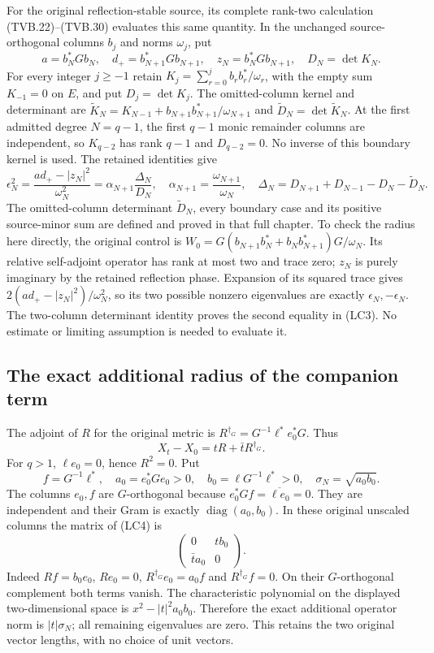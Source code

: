\documentclass{article}
\begin{document}
For the original reflection-stable source, its complete rank-two
calculation (TVB.22)--(TVB.30) evaluates this same quantity. In the
unchanged source-orthogonal columns \(b_j\) and norms \(\omega_j\),
put
\[
 a=b_N^*Gb_N,\quad d_+=b_{N+1}^*Gb_{N+1},\quad
 z_N=b_N^*Gb_{N+1},\quad D_N=\det K_N.
\]
For every integer $j\ge-1$ retain
$K_j=\sum_{r=0}^{j}b_rb_r^*/\omega_r$, with the empty sum
$K_{-1}=0$ on $E$, and put $D_j=\det K_j$.
The omitted-column kernel and determinant are
$\widetilde K_N=K_{N-1}+b_{N+1}b_{N+1}^*/\omega_{N+1}$ and
$\widetilde D_N=\det\widetilde K_N$.
At the first admitted degree $N=q-1$, the first $q-1$ monic
remainder columns are independent, so $K_{q-2}$ has rank $q-1$
and $D_{q-2}=0$. No inverse of this boundary kernel is used.
The retained identities give
\[
 \epsilon_N^2=\frac{ad_+-|z_N|^2}{\omega_N^2}
       =\alpha_{N+1}\frac{\Delta_N}{D_N},
 \quad\alpha_{N+1}=\frac{\omega_{N+1}}{\omega_N},
 \quad
 \Delta_N=D_{N+1}+D_{N-1}-D_N-\widetilde D_N.
 \tag{LC3}
\]
The omitted-column determinant \(\widetilde D_N\), every boundary
case and its positive source-minor sum are defined and proved in
that full chapter. To check the radius here directly, the original
control is
\(W_0=G(b_{N+1}b_N^*+b_Nb_{N+1}^*)G/\omega_N\).
Its relative self-adjoint operator has rank at most two and trace
zero; \(z_N\) is purely imaginary by the retained reflection phase.
Expansion of its squared trace gives
\(2(ad_+-|z_N|^2)/\omega_N^2\), so its two possible nonzero
eigenvalues are exactly \(\epsilon_N,-\epsilon_N\).
The two-column determinant identity proves the second equality
in (LC3). No estimate or limiting assumption is needed to evaluate it.

\subsection{The exact additional radius of the companion term}

The adjoint of \(R\) for the original metric is
\(R^{\dagger_G}=G^{-1}\ell^*e_0^*G\). Thus
\[
 X_t-X_0=tR+\bar tR^{\dagger_G}.
 \tag{LC4}
\]
For \(q>1\), \(\ell e_0=0\), hence \(R^2=0\). Put
\[
 f=G^{-1}\ell^*,\quad a_0=e_0^*Ge_0>0,\quad
 b_0=\ell G^{-1}\ell^*>0,\quad
 \sigma_N=\sqrt{a_0b_0}.
 \tag{LC5}
\]
The columns \(e_0,f\) are \(G\)-orthogonal because
\(e_0^*Gf=\overline{\ell e_0}=0\). They are independent and their
Gram is exactly \(\operatorname{diag}(a_0,b_0)\). In these original
unscaled columns the matrix of (LC4) is
\[
 \begin{pmatrix}0&t b_0\\\bar t a_0&0\end{pmatrix}.
 \tag{LC6}
\]
Indeed \(Rf=b_0e_0\), \(R e_0=0\),
\(R^{\dagger_G}e_0=a_0 f\) and
\(R^{\dagger_G}f=0\). On their \(G\)-orthogonal complement both
terms vanish. The characteristic polynomial on the displayed
two-dimensional space is \(x^2-|t|^2a_0b_0\). Therefore the exact
additional operator norm is \(|t|\sigma_N\); all remaining
eigenvalues are zero. This retains the two original vector lengths,
with no choice of unit vectors.
\end{document}
